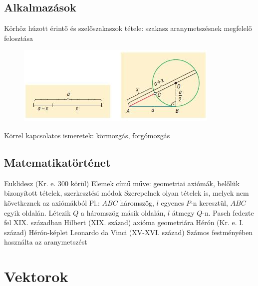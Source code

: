 \documentclass[twoside,12pt]{report}
\theoremstyle{definition}
\begin{document}
\section{Alkalmazások}
	\begin{outline}
		\1 Körhöz húzott érintő és szelőszakaszok tétele: szakasz aranymetszésnek megfelelő felosztása
		\begin{figure}[H]
			\centering
			\includegraphics[width=.7\linewidth]{Arany}
		\end{figure}
		\1 Körrel kapcsolatos ismeretek: körmozgás, forgómozgás
	\end{outline}
\section{Matematikatörténet}
	\begin{outline}
		\1 Euklidesz (Kr. e. 300 körül)
			\2 Elemek című műve: geometriai axiómák, belőlük bizonyított tételek, szerkesztési módok
			\2 Szerepelnek olyan tételek is, melyek nem következnek az axiómákból
			\2 Pl.:  $ABC$ háromszög, $l$ egyenes $P$-n keresztül, $ABC$ egyik oldalán. Létezik $Q$ a háromszög másik oldalán, $l$ átmegy $Q$-n.
				\3 Pasch fedezte fel XIX. században
		\1 Hilbert (XIX. század)
			 axióma geometriára 
		\1 Hérón (Kr. e. I. század)
			\2 Hérón-képlet
		\1 Leonardo da Vinci (XV-XVI. század)
			\2 Számos festményében használta az aranymetszést
	\end{outline}
\chapter{Vektorok}
\end{document}
